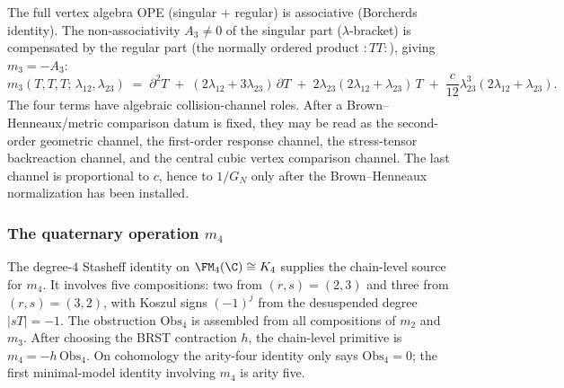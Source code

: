 The full vertex algebra OPE (singular $+$ regular) is associative
(Borcherds identity). The non-associativity $A_3 \neq 0$ of
the singular part ($\lambda$-bracket) is compensated by the regular
part (the normally ordered product $:TT:$), giving $m_3 = -A_3$:
\begin{equation}\label{eq:gravity-m3}
m_3(T,T,T;\,\lambda_{12},\lambda_{23})
\;=\;
\partial^2 T
\;+\; (2\lambda_{12} + 3\lambda_{23})\,\partial T
\;+\; 2\lambda_{23}(2\lambda_{12} + \lambda_{23})\,T
\;+\; \frac{c}{12}\lambda_{23}^3(2\lambda_{12} + \lambda_{23}).
\end{equation}
The four terms have algebraic collision-channel roles.  After a
Brown--Henneaux/metric comparison datum is fixed, they may be read as
the second-order geometric channel, the first-order response channel,
the stress-tensor backreaction channel, and the central cubic vertex
comparison channel.  The last channel is proportional to \(c\), hence
to \(1/G_N\) only after the Brown--Henneaux normalization has been
installed.

\subsubsection*{The quaternary operation $m_4$}

The degree-$4$ Stasheff identity on $\FM_4(\C) \cong K_4$ supplies the
chain-level source for \(m_4\). It involves five compositions: two from
$(r,s) = (2,3)$ and three from $(r,s) = (3,2)$, with Koszul signs
$(-1)^j$ from the desuspended degree $|sT| = -1$. The obstruction
\(\mathrm{Obs}_4\) is assembled from all compositions of \(m_2\) and
\(m_3\). After choosing the BRST contraction \(h\), the chain-level
primitive is \(m_4=-h\,\mathrm{Obs}_4\). On cohomology the arity-four
identity only says \(\mathrm{Obs}_4=0\); the first minimal-model
identity involving \(m_4\) is arity five.

